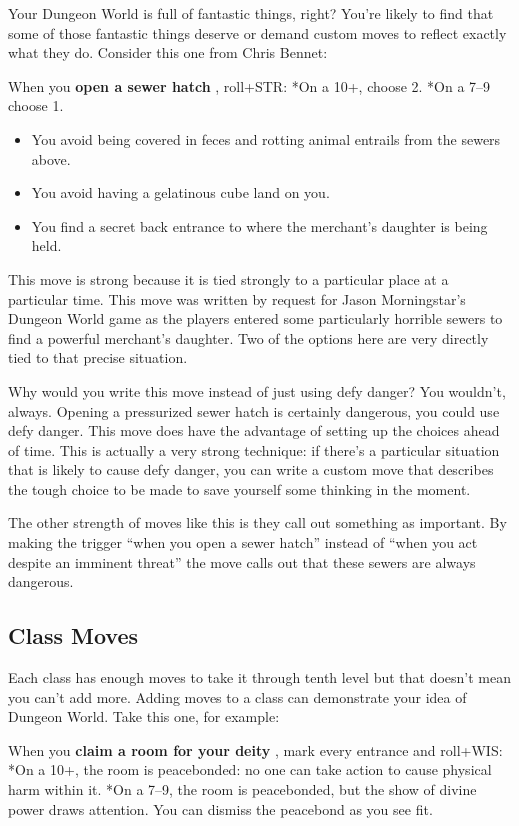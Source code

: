 Your Dungeon World is full of fantastic things, right? You're likely to find that some of those fantastic things deserve or demand custom moves to reflect exactly what they do. Consider this one from Chris Bennet:


When you \textbf{open a sewer hatch}
, roll+STR: *On a 10+, choose 2. *On a 7--9 choose 1.
\begin{itemize}
\item You avoid being covered in feces and rotting animal entrails from the sewers above.
\item You avoid having a gelatinous cube land on you.
\item You find a secret back entrance to where the merchant's daughter is being held.

\end{itemize}


This move is strong because it is tied strongly to a particular place at a particular time. This move was written by request for Jason Morningstar's Dungeon World game as the players entered some particularly horrible sewers to find a powerful merchant's daughter. Two of the options here are very directly tied to that precise situation.


Why would you write this move instead of just using defy danger? You wouldn't, always. Opening a pressurized sewer hatch is certainly dangerous, you could use defy danger. This move does have the advantage of setting up the choices ahead of time. This is actually a very strong technique: if there's a particular situation that is likely to cause defy danger, you can write a custom move that describes the tough choice to be made to save yourself some thinking in the moment.


The other strength of moves like this is they call out something as important. By making the trigger ``when you open a sewer hatch'' instead of ``when you act despite an imminent threat'' the move calls out that these sewers are always dangerous.
\subsection{Class Moves}


Each class has enough moves to take it through tenth level but that doesn't mean you can't add more. Adding moves to a class can demonstrate your idea of Dungeon World. Take this one, for example:


When you \textbf{claim a room for your deity}
, mark every entrance and roll+WIS: *On a 10+, the room is peacebonded: no one can take action to cause physical harm within it. *On a 7--9, the room is peacebonded, but the show of divine power draws attention. You can dismiss the peacebond as you see fit.


